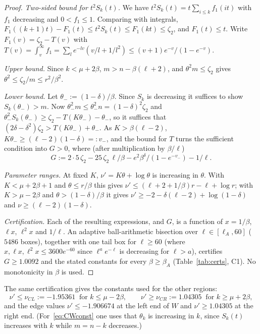 \documentclass[11pt]{amsart}
\theoremstyle{definition}
\theoremstyle{remark}
\numberwithin{equation}{section}
\begin{document}
\begin{proof}
\emph{Two-sided bound for $t^2S_k(t)$.} We have $t^2S_k(t)=t\sum_{i\le k}f_1(it)$ with $f_1$ decreasing and $0<f_1\le1$. Comparing with
integrals, $F_1((k+1)t)-F_1(t)\le t^2S_k(t)\le F_1(kt)\le\zeta_2$, and $F_1(t)\le t$. Write $F_1(v)=\zeta_2-T(v)$ with
$T(v)=\int_v^\infty f_1=\sum_l e^{-lv}(v/l+1/l^2)\le(v+1)e^{-v}/(1-e^{-v})$.

\emph{Upper bound.} Since $k<\mu+2\beta$, $m>n-\beta(\ell+2)$, and $\theta^2m\le\zeta_2$ gives
$\theta^2\le\zeta_2/m\le r^2/\beta^2$.

\emph{Lower bound.} Let $\theta_-:=(1-\delta)/\beta$. Since $S_k$ is decreasing it suffices to show $S_k(\theta_-)>m$. Now
$\theta_-^2m\le\theta_-^2n=(1-\delta)^2\zeta_2$ and $\theta_-^2S_k(\theta_-)\ge\zeta_2-T(K\theta_-)-\theta_-$, so it suffices that
$(2\delta-\delta^2)\zeta_2>T(K\theta_-)+\theta_-$. As $K>\beta(\ell-2)$, $K\theta_-\ge(\ell-2)(1-\delta)=:v_-$, and the bound for $T$
turns the sufficient condition into $G>0$, where (after multiplication by $\beta/\ell$)
\[
  G:=2\cdot5\,\zeta_2-25\,\zeta_2\,\ell/\beta-e^2\beta^{\delta}/(1-e^{-v_-})-1/\ell .
\]

\emph{Parameter ranges.} At fixed $K$, $\nu'=K\theta+\log\theta$ is increasing in $\theta$. With $K<\mu+2\beta+1$ and $\theta\le r/\beta$
this gives $\nu'\le(\ell+2+1/\beta)r-\ell+\log r$; with $K>\mu-2\beta$ and $\theta>(1-\delta)/\beta$ it gives
$\nu'\ge-2-\delta(\ell-2)+\log(1-\delta)$ and $\nu\ge(\ell-2)(1-\delta)$.

\emph{Certification.} Each of the resulting expressions, and $G$, is a function of $x=1/\beta$, $\ell x$, $\ell^2x$ and $1/\ell$. An
adaptive ball-arithmetic bisection over $\ell\in[\ell_A,60]$ ($5486$ boxes), together with one tail box for $\ell\ge60$ (where
$x,\ell x,\ell^2x\le3600e^{-60}$ since $\ell^ae^{-\ell}$ is decreasing for $\ell>a$), certifies $G\ge1.0092$ and the stated
constants for every $\beta\ge\beta_A$ (Table~\ref{tab:certs}, C1). No monotonicity in $\beta$ is used.
\end{proof}

The same certification gives the constants used for the other regions:
\begin{equation}\label{eq:CWconst}
  \nu'\le\nu_{CL}:=-1.95361\ \text{ for }k\le\mu-2\beta,\qquad \nu'\ge\nu_{CR}:=1.04305\ \text{ for }k\ge\mu+2\beta,
\end{equation}
and the edge values $\nu'\le-1.906674$ at the left end of $W$ and $\nu'\ge1.04305$ at the right end. (For~\eqref{eq:CWconst} one uses
that $\theta_k$ is increasing in $k$, since $S_k(t)$ increases with $k$ while $m=n-k$ decreases.)
\end{document}

